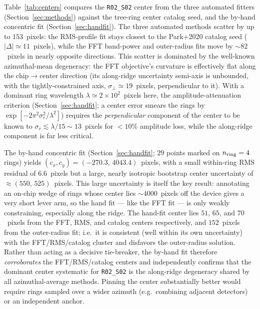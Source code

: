 Table~\ref{tab:centers} compares the \texttt{R02\_S02} center from the three automated fitters
(Section~\ref{sec:methods}) against the \citet{Park2020} tree-ring center catalog seed, and the
by-hand concentric fit (Section~\ref{sec:handfit}). The three automated methods scatter by up to
$153$~pixels: the RMS-profile fit stays closest to the Park+2020 catalog seed
($|\Delta|\simeq11$~pixels), while the FFT band-power and outer-radius fits move by
$\sim82$~pixels in nearly opposite directions.
This scatter is dominated by the well-known azimuthal-mean degeneracy: the FFT objective's
curvature is effectively flat along the chip$\to$center direction (its along-ridge uncertainty
semi-axis is unbounded, with the tightly-constrained axis, $\sigma_\perp\simeq19$~pixels,
perpendicular to it). With a dominant ring wavelength $\lambda\simeq2\times10^2$~pixels here, the
amplitude-attenuation criterion (Section~\ref{sec:handfit}; a center error smears the rings by
$\exp[-2\pi^2\sigma_r^2/\lambda^2]$) requires the \emph{perpendicular} component of the center to
be known to $\sigma_r\lesssim\lambda/15\sim13$~pixels for $<10\%$ amplitude loss, while the
along-ridge component is far less critical.

The by-hand concentric fit (Section~\ref{sec:handfit}; $29$ points marked on $n_{\rm ring}=4$
rings) yields $(c_x,c_y)=(-270.3,\,4043.4)$~pixels, with a small within-ring RMS residual of
$6.6$~pixels but a large, nearly isotropic bootstrap center uncertainty of
$\approx(550,\,525)$~pixels. This large uncertainty is itself the key result: annotating an
on-chip wedge of rings whose center lies $\sim\!4000$~pixels off the device gives a very short
lever arm, so the hand fit — like the FFT fit — is only weakly constraining, especially along
the ridge. The hand-fit center lies $51$, $65$, and $70$~pixels from the FFT, RMS, and catalog
centers respectively, and $152$~pixels from the outer-radius fit; i.e.\ it is consistent (well within
its own uncertainty) with the FFT/RMS/catalog cluster and disfavors the outer-radius solution. Rather
than acting as a decisive tie-breaker, the by-hand fit therefore \emph{corroborates} the
FFT/RMS/catalog centers and independently confirms that the dominant center systematic for
\texttt{R02\_S02} is the along-ridge degeneracy shared by all azimuthal-average methods. Pinning
the center substantially better would require rings sampled over a wider azimuth (e.g.\ combining
adjacent detectors) or an independent anchor.

